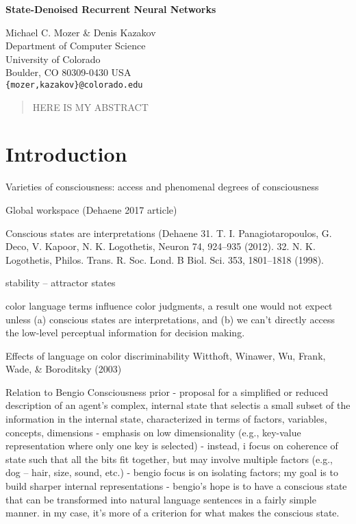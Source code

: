 \documentclass[11pt,letterpaper]{article}
\begin{document}
\begin{center}

{\Large \textbf{State-Denoised Recurrent Neural Networks}}

\vspace{1em}
Michael C. Mozer \& Denis Kazakov \\
Department of Computer Science \\
University of Colorado \\
Boulder, CO 80309-0430 USA \\
{\tt \{mozer,kazakov\}@colorado.edu}
\end{center}


\begin{abstract}
HERE IS MY ABSTRACT
\end{abstract}


\section{Introduction}

Varieties of consciousness:  access and phenomenal
degrees of consciousness

Global workspace (Dehaene 2017 article)

Conscious states are interpretations 
(Dehaene 
31. T. I. Panagiotaropoulos, G. Deco, V. Kapoor, N. K. Logothetis,
Neuron 74, 924–935 (2012).
32. N. K. Logothetis, Philos. Trans. R. Soc. Lond. B Biol. Sci. 353,
1801–1818 (1998).

stability -- attractor states

 color language terms influence color judgments, a result one would not expect unless (a) conscious states are interpretations, and (b) we can't directly access the low-level perceptual information for decision making.

Effects of language on color discriminability
Witthoft, Winawer, Wu, Frank, Wade, \& Boroditsky (2003)

Relation to Bengio Consciousness prior
- proposal for a simplified or reduced description of an agent's complex, 
internal state that selectis a small subset of the information in the internal 
state, characterized in terms of factors, variables, concepts, dimensions
- emphasis on low dimensionality (e.g., key-value representation where only
one key is selected)
- instead, i focus on coherence of state such that all the bits fit together,
  but may involve multiple factors (e.g., dog -- hair, size, sound, etc.)
- bengio focus is on isolating factors; my goal is to build sharper internal
representations
- bengio's hope is to have a conscious state that can be transformed into
natural language sentences in a fairly simple manner.  in my case, it's more
of a criterion for what makes the conscious state.
\end{document}
